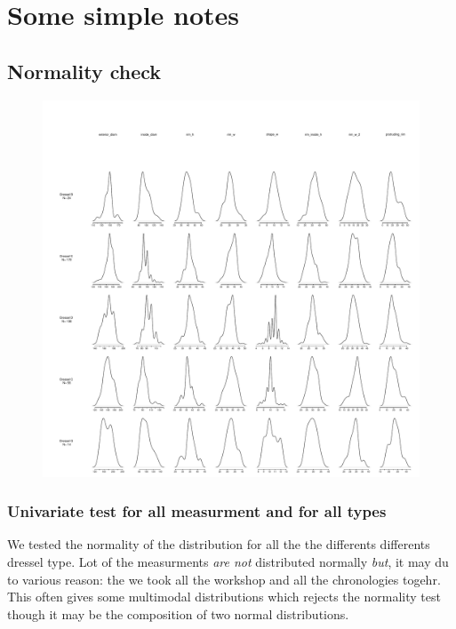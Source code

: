 \documentclass{article}
\begin{document}
\section{ Some simple notes}

\subsection{ Normality check}
\begin{figure}[h]
    \includegraphics[width=\textwidth]{distrib_allmeasurment_dresseltype.pdf}
\end{figure}

\subsubsection{Univariate test for all measurment and for all types}


We tested the normality of the distribution for all the the differents differents dressel type. Lot of the measurments \emph{are not} distributed normally \emph{but}, it may du to various reason: the we took all the workshop and all the chronologies togehr. This often gives some multimodal distributions which rejects the normality test though it may be the composition of two normal distributions.  
\end{document}
